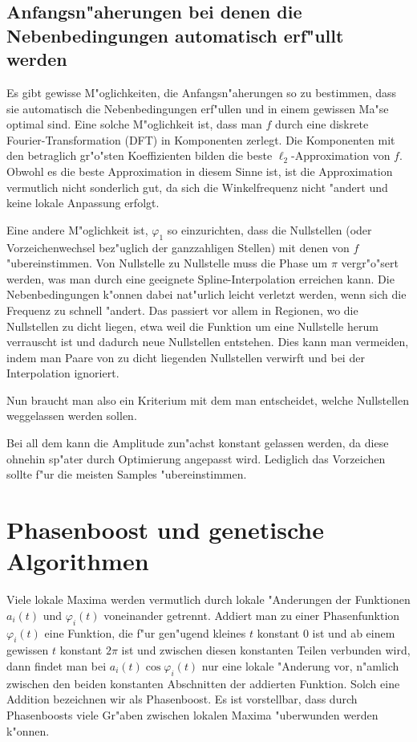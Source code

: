 \documentclass[a4paper]{scrartcl}
\newcommand{\pphi}{{\varphi}}
\begin{document}
\subsection{Anfangsn"aherungen bei denen die Nebenbedingungen automatisch erf"ullt werden}

Es gibt gewisse M"oglichkeiten, die Anfangsn"aherungen so zu bestimmen, dass sie automatisch die Nebenbedingungen erf"ullen und in einem gewissen Ma"se optimal sind. Eine solche M"oglichkeit ist, dass man $f$ durch eine diskrete Fourier-Transformation (DFT) in Komponenten zerlegt. Die Komponenten mit den betraglich gr"o"sten Koeffizienten bilden die beste $\ell_2$-Approximation von $f$. Obwohl es die beste Approximation in diesem Sinne ist, ist die Approximation vermutlich nicht sonderlich gut, da sich die Winkelfrequenz nicht "andert und keine lokale Anpassung erfolgt. 

Eine andere M"oglichkeit ist, $\pphi_1$ so einzurichten, dass die Nullstellen (oder Vorzeichenwechsel bez"uglich der ganzzahligen Stellen) mit denen von $f$ "ubereinstimmen. Von Nullstelle zu Nullstelle muss die Phase um $\pi$ vergr"o"sert werden, was man durch eine geeignete Spline-Interpolation erreichen kann. Die Nebenbedingungen k"onnen dabei nat"urlich leicht verletzt werden, wenn sich die Frequenz zu schnell "andert. Das passiert vor allem in Regionen, wo die Nullstellen zu dicht liegen, etwa weil die Funktion um eine Nullstelle herum verrauscht ist und dadurch neue Nullstellen entstehen. Dies kann man vermeiden, indem man Paare von zu dicht liegenden Nullstellen verwirft und bei der Interpolation ignoriert. 

Nun braucht man also ein Kriterium mit dem man entscheidet, welche Nullstellen weggelassen werden sollen. 

Bei all dem kann die Amplitude zun"achst konstant gelassen werden, da diese ohnehin sp"ater durch Optimierung angepasst wird. Lediglich das Vorzeichen sollte f"ur die meisten Samples "ubereinstimmen. 


\section{Phasenboost und genetische Algorithmen} \label{sec:jumps}

Viele lokale Maxima werden vermutlich durch lokale "Anderungen der Funktionen $a_i(t)$ und $\pphi_i(t)$ voneinander getrennt. Addiert man zu einer Phasenfunktion $\pphi_i(t)$ eine Funktion, die f"ur gen"ugend kleines $t$ konstant $0$ ist und ab einem gewissen $t$ konstant $2\pi$ ist und zwischen diesen konstanten Teilen verbunden wird, dann findet man bei $a_i(t)\cos\pphi_i(t)$ nur eine lokale "Anderung vor, n"amlich zwischen den beiden konstanten Abschnitten der addierten Funktion. Solch eine Addition bezeichnen wir als Phasenboost. Es ist vorstellbar, dass durch Phasenboosts viele Gr"aben zwischen lokalen Maxima "uberwunden werden k"onnen. 
\end{document}
